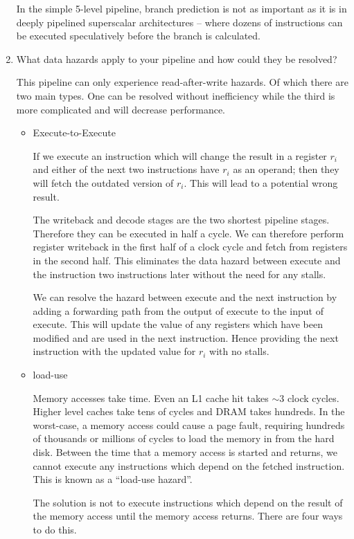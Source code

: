 \documentclass[10pt,\jkfside,a4paper]{article}
\begin{document}
\begin{enumerate}
In the simple 5-level pipeline, branch prediction is not as important as it
is in deeply pipelined superscalar architectures -- where dozens of
instructions can be executed speculatively before the branch is calculated.

\item What data hazards apply to your pipeline and how could they be resolved?

This pipeline can only experience read-after-write hazards. Of which there
are two main types. One can be resolved without inefficiency while the
third is more complicated and will decrease performance.

\begin{itemize}

\item Execute-to-Execute

If we execute an instruction which will change the result in a register $r_i$
and either of the next two instructions have $r_i$ as an operand; then they
will fetch the outdated version of $r_i$. This will lead to a potential
wrong result.

The writeback and decode stages are the two shortest pipeline stages.
Therefore they can be executed in half a cycle. We can therefore perform
register writeback in the first half of a clock cycle and fetch from
registers in the second half. This eliminates the data hazard between
execute and the instruction two instructions later without the need for any
stalls.

We can resolve the hazard between execute and the next instruction by adding a
forwarding path from the output of execute to the input of execute. This
will update the value of any registers which have been modified and are used
in the next instruction. Hence providing the next instruction with the
updated value for $r_i$ with no stalls.

\item load-use

Memory accesses take time. Even an L1 cache hit takes $\sim 3$ clock cycles.
Higher level caches take tens of cycles and DRAM takes hundreds. In the
worst-case, a memory access could cause a page fault, requiring hundreds of
thousands or millions of cycles to load the memory in from the hard disk.
Between the time that a memory access is started and returns, we cannot
execute any instructions which depend on the fetched instruction. This is
known as a ``load-use hazard''.

The solution is not to execute instructions which depend on the result of
the memory access until the memory access returns. There are four ways to
do this.


\end{itemize}
\end{enumerate}
\end{document}
